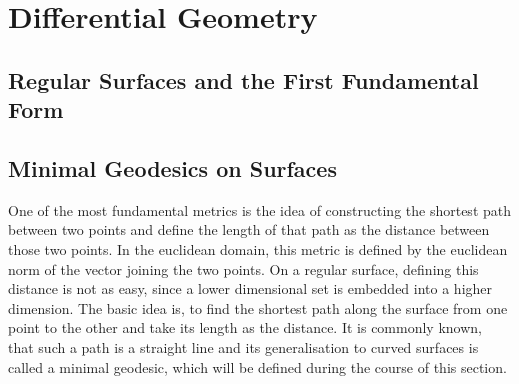 \chapter{Differential Geometry}
\label{chapter:differentialGeometry}

\section{Regular Surfaces and the First Fundamental Form}
\section{Minimal Geodesics on Surfaces}
One of the most fundamental metrics is the idea of constructing the shortest path between two points and define the length of that path as the distance between those two points.
In the euclidean domain, this metric is defined by the euclidean norm of the vector joining the two points.
On a regular surface, defining this distance is not as easy, since a lower dimensional set is embedded into a higher dimension.
The basic idea is, to find the shortest path along the surface from one point to the other and take its length as the distance.
It is commonly known, that such a path is a straight line and its generalisation to curved surfaces is called a minimal geodesic, which will be defined during the course of this section.

